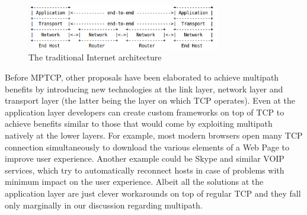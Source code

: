 \begin{figure}[!htb]
\centering
\includegraphics[width=0.75\textwidth]{images/OSI}
\caption{The traditional Internet architecture}
\label{fig:OSI}
\end{figure}

Before MPTCP, other proposals have been elaborated to achieve multipath benefits by introducing new technologies at the link layer, network layer and transport layer (the latter being the layer on which TCP operates). Even at the application layer developers can create custom frameworks on top of TCP to achieve benefits similar to those that would come by exploiting multipath natively at the lower layers. For example, most modern browsers open many TCP connection simultaneously to download the various elements of a Web Page to improve user experience. Another example could be Skype and similar VOIP services, which try to automatically reconnect hosts in case of problems with minimum impact on the user experience. Albeit all the solutions at the application layer are just clever workarounds on top of regular TCP and they fall only marginally in our discussion regarding multipath.

